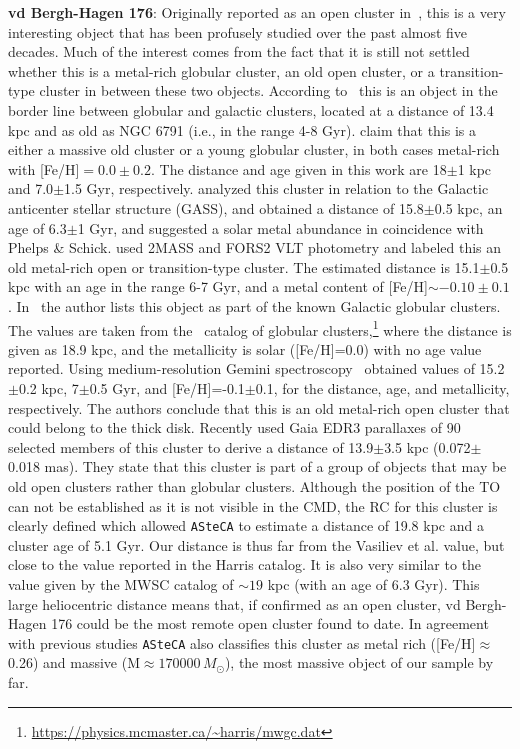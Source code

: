\documentclass[referee]{aa}
\begin{document}
  \noindent \textbf{vd Bergh-Hagen 176}: Originally reported as an open cluster
  in~\cite{vandenBergh_1975}, this is a very interesting object that has been
  profusely studied over the past almost five decades. Much of the interest
  comes from the fact that it is still not settled whether this is a metal-rich
  globular cluster, an old open cluster, or a transition-type cluster in between
  these two objects.
  According to~\cite{Ortolani_1995} this is an object in the border line
  between globular and galactic clusters, located at a distance of 13.4 kpc
  and as old as NGC 6791 (i.e., in the range 4-8 Gyr).
  \cite{Phelps_2003} claim that this is a either a massive old cluster or a
  young globular cluster, in both cases metal-rich with [Fe/H]$=0.0\pm0.2$.
  The distance and age given in this work are 18$\pm$1 kpc and 7.0$\pm$1.5 Gyr,
  respectively.
  \cite{Frinchaboy_2006} analyzed this cluster in relation to the Galactic
  anticenter stellar structure (GASS), and obtained a distance of 15.8$\pm$0.5
  kpc, an age of 6.3$\pm$1 Gyr, and suggested a solar metal abundance in
  coincidence with Phelps \& Schick.
  \cite{Davoust_2011} used 2MASS and FORS2 VLT photometry and labeled this an
  old metal-rich open or transition-type cluster. The estimated  distance is
  15.1$\pm$0.5 kpc with an age in the range 6-7 Gyr, and a metal content of
  [Fe/H]$\sim-0.10\pm0.1$.
  In~\cite{vandenBergh_2011} the author lists this object as part of the known
  Galactic globular clusters. The values are taken from
  the~\cite{Harris_1996,Harris_2010} catalog of globular
  clusters,\footnote{\url{https://physics.mcmaster.ca/~harris/mwgc.dat}}
  where the distance is given as 18.9 kpc,
  and the metallicity is solar ([Fe/H]=0.0) with no age value reported.
  Using medium-resolution Gemini spectroscopy~\cite{Sharina_2014} obtained
  values of 15.2$\pm$0.2 kpc, 7$\pm$0.5 Gyr, and [Fe/H]=-0.1$\pm$0.1, for the
  distance, age, and metallicity, respectively. The authors conclude that this
  is an old metal-rich open cluster that could belong to the thick disk.
  Recently \cite{Vasiliev_2021} used Gaia EDR3 parallaxes of 90 selected
  members of this cluster to derive a distance of 13.9$\pm$3.5 kpc
  (0.072$\pm$0.018 mas). They state that this cluster is part of a group of
  objects that may be old open clusters rather than globular clusters.
  Although the position of the TO can not be established as it is not visible
  in the CMD, the RC for this cluster is clearly defined which allowed
  \texttt{ASteCA} to estimate a distance of 19.8 kpc and a cluster age of 5.1
  Gyr. Our distance is thus far from the Vasiliev et al. value, but close to the
  value reported in the Harris catalog. It is also very similar to the value
  given by the MWSC catalog of $\sim19$ kpc (with an age of 6.3 Gyr).
  This large heliocentric distance means that, if confirmed as an open
  cluster, vd Bergh-Hagen 176 could be the most remote open cluster found to
  date. In agreement with previous studies \texttt{ASteCA} also classifies this
  cluster as metal rich ([Fe/H]$\approx$0.26) and massive (M$\approx170000\,
  M_{\odot}$), the most massive object of our sample by far.\\
\end{document}
